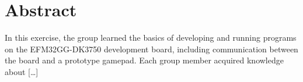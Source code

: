 \chapter{Abstract}
In this exercise, the group learned the basics of developing and running programs on the EFM32GG-DK3750 development board, including communication between the board and a prototype gamepad. Each group member acquired knowledge about [\ldots]

